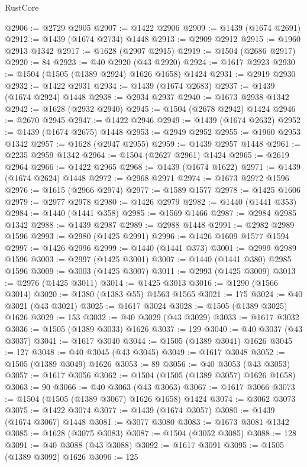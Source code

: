 \begin{lexlean}{RustCore}
\begin{coremodule}
@2906 := @2729 @2905
@2907 := @1422 @2906
@2909 := @1439 (@1674 @2691)
@2912 := @1439 (@1674 @2734) @1448
@2913 := @2909 @2912
@2915 := @1960 @2913 @1342
@2917 := @1628 (@2907 @2915)
@2919 := @1504 (@2686 @2917)
@2920 := 84
@2923 := @40 @2920 (@43 @2920)
@2924 := @1617 @2923
@2930 := @1504 (@1505 (@1389 @2924) @1626 @1658) @1424
@2931 := @2919 @2930
@2932 := @1422 @2931
@2934 := @1439 (@1674 @2683)
@2937 := @1439 (@1674 @2924) @1448
@2938 := @2934 @2937
@2940 := @1673 @2938 @1342
@2942 := @1628 (@2932 @2940)
@2945 := @1504 (@2678 @2942) @1424
@2946 := @2670 @2945
@2947 := @1422 @2946
@2949 := @1439 (@1674 @2632)
@2952 := @1439 (@1674 @2675) @1448
@2953 := @2949 @2952
@2955 := @1960 @2953 @1342
@2957 := @1628 (@2947 @2955)
@2959 := @1439 @2957 @1448
@2961 := @2235 @2959 @1342
@2964 := @1504 (@2627 @2961) @1424
@2965 := @2619 @2964
@2966 := @1422 @2965
@2968 := @1439 (@1674 @1622)
@2971 := @1439 (@1674 @2624) @1448
@2972 := @2968 @2971
@2974 := @1673 @2972 @1596
@2976 := @1615 (@2966 @2974)
@2977 := @1589 @1577
@2978 := @1425 @1606
@2979 := @2977 @2978
@2980 := @1426 @2979
@2982 := @1440 (@1441 @353)
@2984 := @1440 (@1441 @358)
@2985 := @1569 @1466
@2987 := @2984 @2985 @1342
@2988 := @1439 @2987
@2989 := @2988 @1448
@2991 := @2982 @2989 @1596
@2993 := @2980 (@1425 @2991)
@2996 := @1426 @1609 @1577 @1594
@2997 := @1426 @2996
@2999 := @1440 (@1441 @373)
@3001 := @2999 @2989 @1596
@3003 := @2997 (@1425 @3001)
@3007 := @1440 (@1441 @380) @2985 @1596
@3009 := @3003 (@1425 @3007)
@3011 := @2993 (@1425 @3009)
@3013 := @2976 (@1425 @3011)
@3014 := @1425 @3013
@3016 := @1290 (@1566 @3014)
@3020 := @1380 (@1383 @55) @1563 @1565
@3021 := 175
@3024 := @40 @3021 (@43 @3021)
@3025 := @1617 @3024
@3028 := @1505 (@1389 @3025) @1626
@3029 := 153
@3032 := @40 @3029 (@43 @3029)
@3033 := @1617 @3032
@3036 := @1505 (@1389 @3033) @1626
@3037 := 129
@3040 := @40 @3037 (@43 @3037)
@3041 := @1617 @3040
@3044 := @1505 (@1389 @3041) @1626
@3045 := 127
@3048 := @40 @3045 (@43 @3045)
@3049 := @1617 @3048
@3052 := @1505 (@1389 @3049) @1626
@3053 := 89
@3056 := @40 @3053 (@43 @3053)
@3057 := @1617 @3056
@3062 := @1504 (@1505 (@1389 @3057) @1626 @1658)
@3063 := 90
@3066 := @40 @3063 (@43 @3063)
@3067 := @1617 @3066
@3073 := @1504 (@1505 (@1389 @3067) @1626 @1658) @1424
@3074 := @3062 @3073
@3075 := @1422 @3074
@3077 := @1439 (@1674 @3057)
@3080 := @1439 (@1674 @3067) @1448
@3081 := @3077 @3080
@3083 := @1673 @3081 @1342
@3085 := @1628 (@3075 @3083)
@3087 := @1504 (@3052 @3085)
@3088 := 128
@3091 := @40 @3088 (@43 @3088)
@3092 := @1617 @3091
@3095 := @1505 (@1389 @3092) @1626
@3096 := 125

\end{coremodule}
\end{lexlean}
